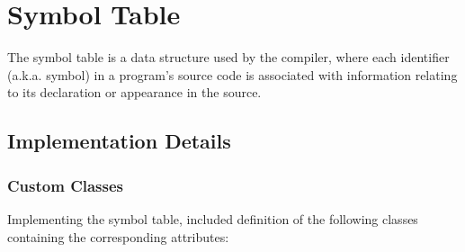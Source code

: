 \documentclass{article}
\begin{document}
\newpage


\section{Symbol Table}
The symbol table is a data structure used by the compiler, where each identifier (a.k.a. symbol) in a program's
source code is associated with information relating to its declaration or appearance in the source.


\subsection{Implementation Details}

\subsubsection{Custom Classes}
Implementing the symbol table, included definition of the following classes containing the corresponding attributes:
\end{document}
